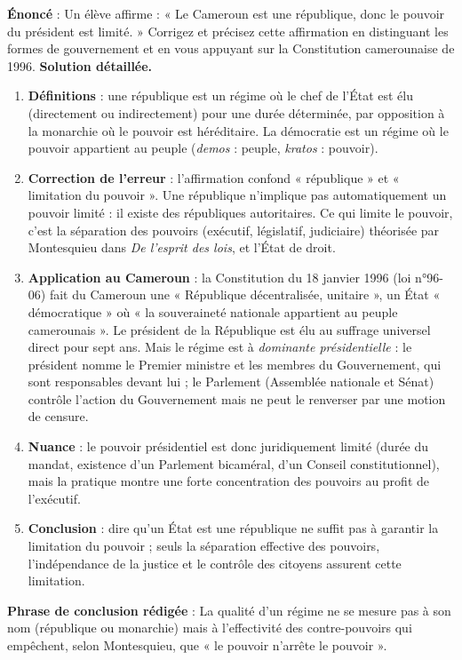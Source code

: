 \documentclass[11pt]{article}
\newcommand{\cle}[1]{{\popxbold\color{popdark}#1}}
\begin{document}
\begin{exoresolu}
\textbf{Énoncé} : Un élève affirme : « Le Cameroun est une république, donc le pouvoir du président est limité. » Corrigez et précisez cette affirmation en distinguant les formes de gouvernement et en vous appuyant sur la Constitution camerounaise de 1996.
\tcblower
\textbf{Solution détaillée.}
\begin{enumerate}
\item \textbf{Définitions} : une \cle{république} est un régime où le chef de l'État est élu (directement ou indirectement) pour une durée déterminée, par opposition à la monarchie où le pouvoir est héréditaire. La \cle{démocratie} est un régime où le pouvoir appartient au peuple (\emph{demos} : peuple, \emph{kratos} : pouvoir).
\item \textbf{Correction de l'erreur} : l'affirmation confond « république » et « limitation du pouvoir ». Une république n'implique pas automatiquement un pouvoir limité : il existe des républiques autoritaires. Ce qui limite le pouvoir, c'est la \cle{séparation des pouvoirs} (exécutif, législatif, judiciaire) théorisée par Montesquieu dans \emph{De l'esprit des lois}, et l'État de droit.
\item \textbf{Application au Cameroun} : la Constitution du 18 janvier 1996 (loi n°96-06) fait du Cameroun une « République décentralisée, unitaire », un État « démocratique » où « la souveraineté nationale appartient au peuple camerounais ». Le président de la République est élu au suffrage universel direct pour sept ans. Mais le régime est à \emph{dominante présidentielle} : le président nomme le Premier ministre et les membres du Gouvernement, qui sont responsables devant lui ; le Parlement (Assemblée nationale et Sénat) contrôle l'action du Gouvernement mais ne peut le renverser par une motion de censure.
\item \textbf{Nuance} : le pouvoir présidentiel est donc juridiquement limité (durée du mandat, existence d'un Parlement bicaméral, d'un Conseil constitutionnel), mais la pratique montre une forte concentration des pouvoirs au profit de l'exécutif.
\item \textbf{Conclusion} : dire qu'un État est une république ne suffit pas à garantir la limitation du pouvoir ; seuls la séparation effective des pouvoirs, l'indépendance de la justice et le contrôle des citoyens assurent cette limitation.
\end{enumerate}
\textbf{Phrase de conclusion rédigée} : La qualité d'un régime ne se mesure pas à son nom (république ou monarchie) mais à l'effectivité des contre-pouvoirs qui empêchent, selon Montesquieu, que « le pouvoir n'arrête le pouvoir ».
\end{exoresolu}
\end{document}
